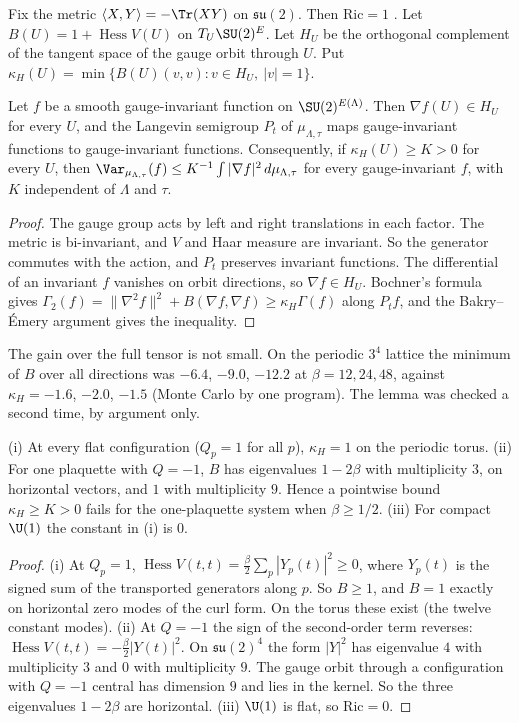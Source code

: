 Fix the metric $\langle X,Y\rangle=-\Tr(XY)$ on $\mathfrak{su}(2)$. Then $\mathrm{Ric}=1$
\cite{SZZ23}. Let $B(U)=1+\operatorname{Hess}V(U)$ on $T_U\SU(2)^E$. Let $H_U$ be the orthogonal
complement of the tangent space of the gauge orbit through $U$. Put
$\kappa_H(U)=\min\{B(U)(v,v):v\in H_U,\ |v|=1\}$.

\begin{lemma}\label{neg:lem-horizontal}
Let $f$ be a smooth gauge-invariant function on $\SU(2)^{E(\Lambda)}$. Then $\nabla f(U)\in H_U$
for every $U$, and the Langevin semigroup $P_t$ of $\mu_{\Lambda,\tau}$ maps gauge-invariant
functions to gauge-invariant functions. Consequently, if $\kappa_H(U)\ge K>0$ for every $U$,
then $\Var_{\mu_{\Lambda,\tau}}(f)\le K^{-1}\int|\nabla f|^2\,d\mu_{\Lambda,\tau}$ for every
gauge-invariant $f$, with $K$ independent of $\Lambda$ and $\tau$.
\end{lemma}

\begin{proof}
The gauge group acts by left and right translations in each factor. The metric is
bi-invariant, and $V$ and Haar measure are invariant. So the generator commutes with the
action, and $P_t$ preserves invariant functions. The differential of an invariant $f$
vanishes on orbit directions, so $\nabla f\in H_U$. Bochner's formula gives
$\Gamma_2(f)=\|\nabla^2 f\|^2+B(\nabla f,\nabla f)\ge\kappa_H\Gamma(f)$ along $P_tf$, and the
Bakry--\'Emery argument \cite[Thm.~1.4 and (4.7)]{SZZ23} gives the inequality.
\end{proof}

The gain over the full tensor is not small. On the periodic $3^4$ lattice the minimum of $B$
over all directions was $-6.4$, $-9.0$, $-12.2$ at $\beta=12,24,48$, against $\kappa_H=-1.6$,
$-2.0$, $-1.5$ (Monte Carlo by one program). The lemma was checked a second time, by argument
only.

\begin{proposition}\label{neg:prop-flat}
\textup{(i)} At every flat configuration ($Q_p=1$ for all $p$), $\kappa_H=1$ on the periodic torus.
\textup{(ii)} For one plaquette with $Q=-1$, $B$ has eigenvalues $1-2\beta$ with multiplicity $3$,
on horizontal vectors, and $1$ with multiplicity $9$. Hence a pointwise bound
$\kappa_H\ge K>0$ fails for the one-plaquette system when $\beta\ge 1/2$.
\textup{(iii)} For compact $\U(1)$ the constant in \textup{(i)} is $0$.
\end{proposition}

\begin{proof}
(i) At $Q_p=1$, $\operatorname{Hess}V(t,t)=\frac{\beta}{2}\sum_p|Y_p(t)|^2\ge0$, where $Y_p(t)$
is the signed sum of the transported generators along $p$. So $B\ge1$, and $B=1$ exactly on
horizontal zero modes of the curl form. On the torus these exist (the twelve constant modes).
(ii) At $Q=-1$ the sign of the second-order term reverses:
$\operatorname{Hess}V(t,t)=-\frac{\beta}{2}|Y(t)|^2$. On $\mathfrak{su}(2)^4$ the form $|Y|^2$ has
eigenvalue $4$ with multiplicity $3$ and $0$ with multiplicity $9$. The gauge orbit through a
configuration with $Q=-1$ central has dimension $9$ and lies in the kernel. So the three
eigenvalues $1-2\beta$ are horizontal.
(iii) $\U(1)$ is flat, so $\mathrm{Ric}=0$.
\end{proof}

